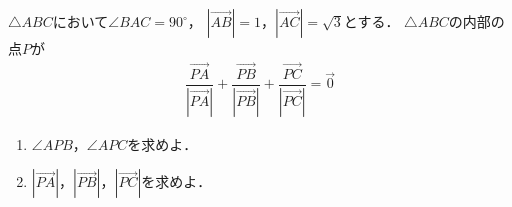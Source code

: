 \documentclass[../../main.tex]{subfiles}
\begin{document}
$\triangle ABC$において$\angle BAC={90}^\circ$，
$|\overrightarrow{AB}|=1$，$|\overrightarrow{AC}|=\sqrt3$とする．
$\triangle ABC$の内部の点$P$が
\begin{align*}
  \dfrac{\overrightarrow{PA}}{|\overrightarrow{PA}|}+
  \dfrac{\overrightarrow{PB}}{|\overrightarrow{PB}|}+
  \dfrac{\overrightarrow{PC}}{|\overrightarrow{PC}|}=\vec{0}
\end{align*}
\begin{enumerate}
  \item $\angle APB$，$\angle APC$を求めよ．
  \item $|\overrightarrow{PA}|$，$|\overrightarrow{PB}|$，$|\overrightarrow{PC}|$を求めよ．
\end{enumerate}
\end{document}
